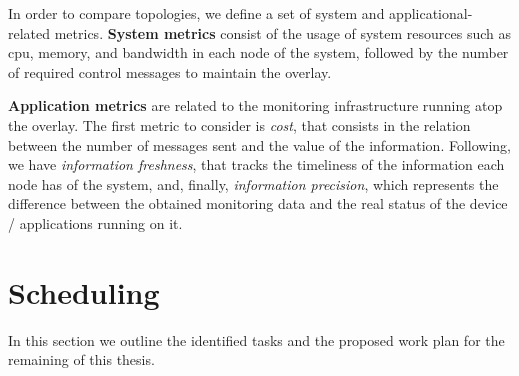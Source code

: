 In order to compare topologies, we define a set of system and applicational-related metrics. \textbf{System metrics} consist of the usage of system resources such as cpu, memory, and bandwidth in each node of the system, followed by the number of required control messages to maintain the overlay.

\textbf{Application metrics} are related to the monitoring infrastructure running atop the overlay. The first metric to consider is \textit{cost}, that consists in the relation between the number of messages sent and the value of the information. 
Following, we have \textit{information freshness}, that tracks the timeliness of the information each node has of the system, and, finally, \textit{information precision}, which represents the difference between the obtained monitoring data and the real status of the device / applications running on it. 


\section{Scheduling}

In this section we outline the identified tasks and the proposed work plan for the remaining of this thesis. 

